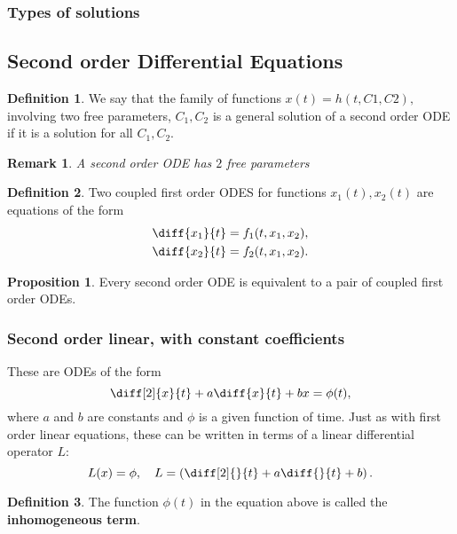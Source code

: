 \documentclass[12pt, a4paper]{article}
\newtheorem*{remark}{Remark}
\theoremstyle{definition}
\newtheorem{definition}{Definition}[section]
\newtheorem{proposition}{Proposition}
\theoremstyle{plain}
\begin{document}
\subsubsection{Types of solutions}



\subsection{Second order Differential Equations}

\begin{definition}
We say that the family of functions $x(t) = h(t, C1, C2),$ involving two free parameters, $C_1, C_2$
is a general solution of a second order ODE if it is a solution for all $C_1,C_2.$
\end{definition}

\begin{remark}
A second order ODE has $2$ free parameters
\end{remark}

\begin{definition}
Two coupled first order ODES for functions $x_1(t), x_2(t)$ are equations of the form $$\begin{aligned}
\diff{x_1}{t}&=f_1(t,x_1,x_2), \\
\diff{x_2}{t}&=f_2(t,x_1,x_2).
\end{aligned}$$
\end{definition}

\begin{proposition}
Every second order ODE is equivalent to a pair of coupled first order ODEs.
\end{proposition}

\subsubsection{Second order linear, with constant coefficients}

These are ODEs of the form $$\diff[2]{x}{t}+a\diff{x}{t}+bx=\phi(t),$$ where $a$ and $b$ are constants and $\phi$ is a given function of time. Just as with first order linear equations, these can be written in terms of a linear differential operator $L:$ $$L(x)=\phi, \quad L=\left(\diff[2]{}{t}+a\diff{}{t}+b\right).$$

\begin{definition}
The function $\phi(t)$ in the equation above is called the \textbf{inhomogeneous term}.
\end{definition}
\end{document}
